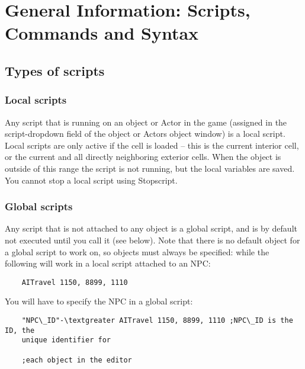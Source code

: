 \hypertarget{general-information-scripts-commands-and-syntax}{%
\section{\texorpdfstring{\hfill\break
General Information: Scripts, Commands and
Syntax}{ General Information: Scripts, Commands and Syntax}}\label{general-information-scripts-commands-and-syntax}}

\hypertarget{types-of-scripts}{%
\subsection{Types of scripts}\label{types-of-scripts}}

\hypertarget{local-scripts}{%
\subsubsection{Local scripts}\label{local-scripts}}

Any script that is running on an object or Actor in the game (assigned
in the script-dropdown field of the object or Actors object window) is a
local script. Local scripts are only active if the cell is loaded --
this is the current interior cell, or the current and all directly
neighboring exterior cells. When the object is outside of this range the
script is not running, but the local variables are saved. You cannot
stop a local script using Stopscript.

\hypertarget{global-scripts}{%
\subsubsection{Global scripts}\label{global-scripts}}

Any script that is not attached to any object is a global script, and is
by default not executed until you call it (see below). Note that there
is no default object for a global script to work on, so objects must
always be specified: while the following will work in a local script
attached to an NPC:

\begin{lstlisting}
	AITravel 1150, 8899, 1110
\end{lstlisting}

You will have to specify the NPC in a global script:

\begin{lstlisting}
	"NPC\_ID"-\textgreater AITravel 1150, 8899, 1110 ;NPC\_ID is the ID, the
	unique identifier for
	
	;each object in the editor
\end{lstlisting}

